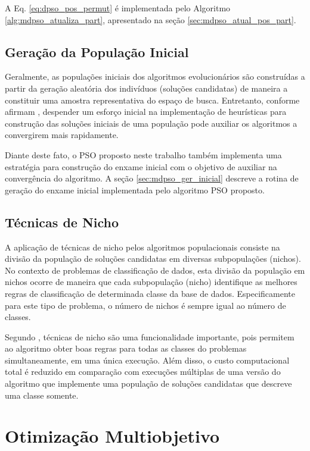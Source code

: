 \documentclass[
	12pt,				%
	openany,			%
	oneside,	
	a4paper,			%
	brazil,				%
	]{unimontes-ppgmsc-abntex2}
\begin{document}
A Eq. \ref{eq:dpso_pos_permut} é implementada pelo Algoritmo \ref{alg:mdpso_atualiza_part}, apresentado na seção \ref{sec:mdpso_atual_pos_part}.

\subsection{Geração da População Inicial}
\label{sec:ger_inicial}

Geralmente, as populações iniciais dos algoritmos evolucionários são construídas a partir da geração aleatória dos indivíduos (soluções candidatas) de maneira a constituir uma amostra representativa do espaço de busca. Entretanto, conforme afirmam , despender um esforço inicial na implementação de heurísticas para construção das soluções iniciais de uma população pode auxiliar os algoritmos a convergirem mais rapidamente. 

Diante deste fato, o PSO proposto neste trabalho também implementa uma estratégia para construção do enxame inicial com o objetivo de auxiliar na convergência do algoritmo. A seção \ref{sec:mdpso_ger_inicial} descreve a rotina de geração do enxame inicial implementada pelo algoritmo PSO proposto.

\subsection{Técnicas de Nicho}
\label{sec:tec_nicho}

A aplicação de técnicas de nicho pelos algoritmos populacionais consiste na divisão da população de soluções candidatas em diversas subpopulações (nichos). No contexto de problemas de classificação de dados, esta divisão da população em nichos ocorre de maneira que cada subpopulação (nicho) identifique as melhores regras de classificação de determinada classe da base de dados. Especificamente para este tipo de problema, o número de nichos é sempre igual ao número de classes.

Segundo , técnicas de nicho são uma funcionalidade importante, pois permitem ao algoritmo obter boas regras para todas as classes do problemas simultaneamente, em uma única execução. Além disso, o custo computacional total é reduzido em comparação com execuções múltiplas de uma versão do algoritmo que implemente uma população de soluções candidatas que descreve uma classe somente.

\section{Otimização Multiobjetivo}
\label{sec:multi_obj}
\end{document}
